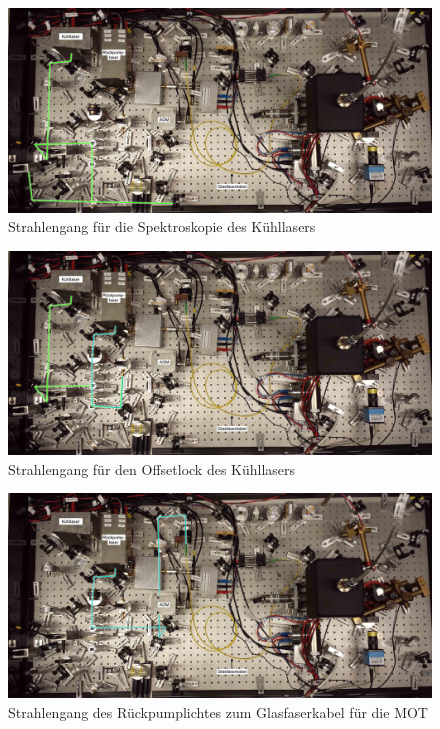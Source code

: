 \documentclass[
class=book,
accentcolor=1b,
custommargins=geometry,
fontsize=11pt,
thesis={type=Versuchsanleitung},
ruledheaders=all,
headline=false,
instbox=false,
marginpar=false,
title=small,
ignore-missing-data=true,
twoside=false,
logofile=apqdesign/tuda_logo.pdf,
pdfa=false %
]{apqpub}
\begin{document}
					\begin{figure}[htb!]
						\centering
						\includegraphics[width=\textwidth]{graphics/SPS.jpg}
						\caption{Strahlengang für die \textcolor[cmyk]{0.6,0,1,0}{Spektroskopie des Kühllasers}}
						\label{fig:SPS}
					\end{figure}
					\begin{figure}[htb!]
						\centering
						\includegraphics[width=\textwidth]{graphics/OFL.jpg}
						\caption{Strahlengang für den Offsetlock des Kühllasers}
						\label{fig:OFL}
					\end{figure}
					\begin{figure}[htb!]
						\centering
						\includegraphics[width=\textwidth]{graphics/MM.jpg}
						\caption{Strahlengang des \textcolor[cmyk]{0.71,0,0.4,0}{Rückpumplichtes zum Glasfaserkabel} für die MOT}
						\label{fig:MM}
					\end{figure}
\end{document}
